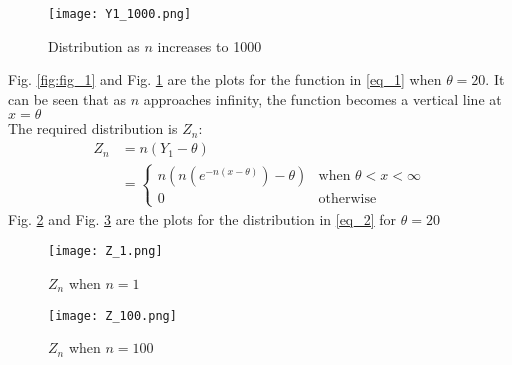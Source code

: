 \documentclass[journal,12pt,twocolumn]{IEEEtran}
\theoremstyle{remark}
\numberwithin{equation}{subsection}
\begin{document}
\begin{figure}[h]
    \centering
    \texttt{[image: Y1\_1000.png]}
    \caption{Distribution as $n$ increases to 1000}
    \label{fig:fig_2}
\end{figure}
Fig. \ref{fig:fig_1} and Fig. \ref{fig:fig_2} are the plots for the function in \eqref{eq_1} when $\theta=20$. It can be seen that as $n$ approaches infinity, the function becomes a vertical line at $x=\theta$ \\

The required distribution is $Z_n$:
\begin{align}
    Z_n &= n(Y_1 - \theta)\\
    &=\label{eq_2}
    \begin{cases}
    n(n(e^{-n(x-\theta)})-\theta)&\text{when }\theta<x<\infty\\
    0 &\text{otherwise}
    \end{cases}
\end{align}
Fig. \ref{fig:fig_3} and Fig. \ref{fig:fig_4} are the plots for the distribution in \eqref{eq_2} for $\theta=20$
\begin{figure}[h]
    \centering
    \texttt{[image: Z\_1.png]}
    \caption{$Z_n$ when $n=1$}
    \label{fig:fig_3}
\end{figure}
\begin{figure}[H]
    \centering
    \texttt{[image: Z\_100.png]}
    \caption{$Z_n$ when $n=100$}
    \label{fig:fig_4}
\end{figure}
\end{document}

